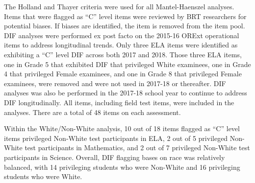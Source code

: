 \documentclass[]{article}
\begin{document}
The Holland and Thayer criteria were used for all Mantel-Haenszel
analyses. Items that were flagged as ``C'' level items were reviewed by
BRT researchers for potential biases. If biases are identified, the item
is removed from the item pool. DIF analyses were performed ex post facto
on the 2015-16 ORExt operational items to address longitudinal trends.
Only three ELA items were identified as exhibiting a ``C'' level DIF
across both 2017 and 2018. Those three ELA items, one in Grade 5 that
exhibited DIF that privileged White examinees, one in Grade 4 that
privileged Female examinees, and one in Grade 8 that privileged Female
examinees, were removed and were not used in 2017-18 or thereafter. DIF
analyses was also be performed in the 2017-18 school year to continue to
address DIF longitudinally. All items, including field test items, were
included in the analyses. There are a total of 48 items on each
assessment.

Within the White/Non-White analysis, 10 out of 18 items flagged as ``C''
level items privileged Non-White test participants in ELA, 2 out of 5
privileged Non-White test participants in Mathematics, and 2 out of 7
privileged Non-White test participants in Science. Overall, DIF flagging
bases on race was relatively balanced, with 14 privileging students who
were Non-White and 16 privileging students who were White.
\end{document}
